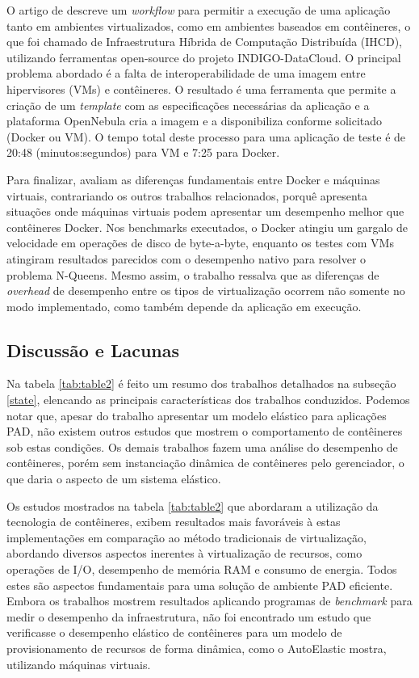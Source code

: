 \documentclass[twoside,english,brazilian]{UNISINOSartigo}
\begin{document}
O artigo de  descreve um \textit{workflow} para permitir a execução de uma aplicação tanto em ambientes virtualizados, como em ambientes baseados em contêineres, o que foi chamado de Infraestrutura Híbrida de Computação Distribuída (IHCD), utilizando ferramentas open-source do projeto INDIGO-DataCloud. O principal problema abordado é a falta de interoperabilidade de uma imagem entre hipervisores (VMs) e contêineres. O resultado é uma ferramenta que permite a criação de um \textit{template} com as especificações necessárias da aplicação e a plataforma OpenNebula cria a imagem e a disponibiliza conforme solicitado (Docker ou VM). O tempo total deste processo para uma aplicação de teste é de 20:48 (minutos:segundos) para VM e 7:25 para Docker.

Para finalizar,  avaliam as diferenças fundamentais entre Docker e máquinas virtuais, contrariando os outros trabalhos relacionados, porquê apresenta situações onde máquinas virtuais podem apresentar um desempenho melhor que contêineres Docker. Nos benchmarks executados, o Docker atingiu um gargalo de velocidade em operações de disco de byte-a-byte, enquanto os testes com VMs atingiram resultados parecidos com o desempenho nativo para resolver o problema N-Queens. Mesmo assim, o trabalho ressalva que as diferenças de \textit{overhead} de desempenho entre os tipos de virtualização ocorrem não somente no modo implementado, como também depende da aplicação em execução. 

\subsection{Discussão e Lacunas}
\label{comparacao}
Na tabela \ref{tab:table2} é feito um resumo dos trabalhos detalhados na subseção \ref{state}, elencando as principais características dos trabalhos conduzidos. Podemos notar que, apesar do trabalho  apresentar um modelo elástico para aplicações PAD, não existem outros estudos que mostrem o comportamento de contêineres sob estas condições. Os demais trabalhos fazem uma análise do desempenho de contêineres, porém sem instanciação dinâmica de contêineres pelo gerenciador, o que daria o aspecto de um sistema elástico.

Os estudos mostrados na tabela \ref{tab:table2} que abordaram a utilização da tecnologia de contêineres, exibem resultados mais favoráveis à estas implementações em comparação ao método tradicionais de virtualização, abordando diversos aspectos inerentes à virtualização de recursos, como operações de I/O, desempenho de memória RAM e consumo de energia. Todos estes são aspectos fundamentais para uma solução de ambiente PAD eficiente. Embora os trabalhos mostrem resultados aplicando programas de \textit{benchmark} para medir o desempenho da infraestrutura, não foi encontrado um estudo que verificasse o desempenho elástico de contêineres para um modelo de provisionamento de recursos de forma dinâmica, como o AutoElastic mostra, utilizando máquinas virtuais.
\end{document}
